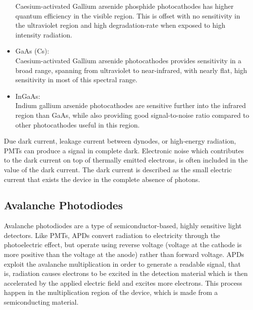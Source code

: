 \begin{itemize}
Caesium-activated Gallium arsenide phosphide photocathodes has higher quantum efficiency in the visible region. This is offset with no sensitivity in the ultraviolet region and high degradation-rate when exposed to high intensity radiation.
\\
\item GaAs (Cs):\\
Caesium-activated Gallium arsenide photocathodes provides sensitivity in a broad range, spanning from ultraviolet to near-infrared, with nearly flat, high sensitivity in most of this spectral range.
\\
\item InGaAs:\\ 
Indium gallium arsenide photocathodes are sensitive further into the infrared region than GaAs, while also providing good signal-to-noise ratio compared to other photocathodes useful in this region.
\end{itemize}

Due dark current, leakage current between dynodes, or high-energy radiation, PMTs can produce a signal in complete dark. Electronic noise which contributes to the dark current on top of thermally emitted electrons, is often included in the value of the dark current. The dark current is described as the small electric current that exists the device in the complete absence of photons. 

\subsection{Avalanche Photodiodes}
Avalanche photodiodes are a type of semiconductor-based, highly sensitive light detectors. Like PMTs, APDs convert radiation to electricity through the photoelectric effect, but operate using reverse voltage (voltage at the cathode is more positive than the voltage at the anode) rather than forward voltage. APDs exploit the avalanche multiplication in order to generate a readable signal, that is, radiation causes electrons to be excited in the detection material which is then accelerated by the applied electric field and excites more electrons. This process happen in the multiplication region of the device, which is made from a semiconducting material.

